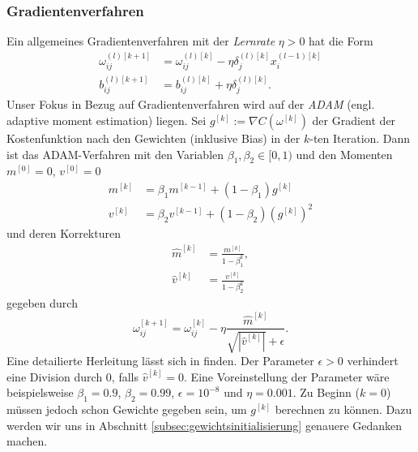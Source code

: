 \subsubsection{Gradientenverfahren}
Ein allgemeines Gradientenverfahren mit der \textit{Lernrate} $\eta > 0$ hat die Form
\begin{align*}
    \omega_{ij}^{(l)[k+1]} &= \omega_{ij}^{(l)[k]} - \eta \delta_{j}^{(l)[k]} x_i^{(l-1)[k]}\\
    b_{ij}^{(l)[k+1]} &= b_{ij}^{(l)[k]} + \eta \delta_{j}^{(l)[k]}.
\end{align*}
Unser Fokus in Bezug auf Gradientenverfahren wird auf der \textit{ADAM} (engl. adaptive moment estimation) liegen. Sei
$g^{[k]} := \nabla C(\omega^{[k]})$ der Gradient der Kostenfunktion nach den Gewichten (inklusive Bias) in der $k$-ten
Iteration. Dann ist das ADAM-Verfahren mit den Variablen $\beta_1,\beta_2 \in [0,1)$ und den Momenten $m^{[0]}=0$,
$v^{[0]}=0$
\begin{align*}
    m^{[k]} &= \beta_1 m^{[k-1]} + (1-\beta_1)g^{[k]} \\
    v^{[k]} &= \beta_2 v^{[k-1]} + (1-\beta_2)(g^{[k]})^2
\end{align*}
und deren Korrekturen
\begin{align*}
    \hat{m}^{[k]} &= \frac{m^{[k]}}{1-\beta_1^k}, \\
    \hat{v}^{[k]} &= \frac{v^{[k]}}{1-\beta_2^k}
\end{align*}
gegeben durch
\[
    \omega_{ij}^{[k+1]}= \omega_{ij}^{[k]} - \eta \frac{\hat{m}^{[k]}}{\sqrt{|\hat{v}^{[k]}|} + \epsilon}.
\]
Eine detailierte Herleitung lässt sich in \cite[103-104]{ovidiucalinDeepLearningArchitectures} finden.
Der Parameter $\epsilon > 0$ verhindert eine Division durch $0$, falls $\hat{v}^{[k]} = 0$. Eine
Voreinstellung der Parameter wäre beispielsweise $\beta_1=0.9$, $\beta_2=0.99$, $\epsilon=10^{-8}$ und $\eta = 0.001$. Zu Beginn ($k=0$)
müssen jedoch schon Gewichte gegeben sein, um $g^{[k]}$ berechnen zu können. Dazu werden wir uns in
Abschnitt \ref{subsec:gewichtsinitialisierung} genauere Gedanken machen.\\

